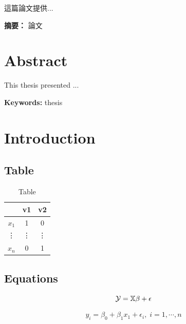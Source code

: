 \documentclass[12pt,a4paper,oneside]{book}
\providecommand{\keywordsch}[1]
{
  \small  
  \textbf{摘要： }#1
}
\providecommand{\keywords}[1]
{
  \small  
  \textbf{Keywords: }#1
}
\begin{document}
這篇論文提供...

\mbox{}
\vfill
\keywordsch{論文}%

\thispagestyle{empty}

\chapter*{\centering Abstract}

This thesis presented ...

\mbox{}
\vfill
\keywords{thesis}%

\thispagestyle{empty}

\newpage
\setcounter{page}{1}
{
  \hypersetup{linkcolor=black}
  \tableofcontents
}

\newpage

\chapter{Introduction}
\label{ch: intro}
\section{Table}

\begin{table}[H]
\centering
\fontsize{20}{20}\selectfont%
\caption{Table}
\renewcommand{\arraystretch}{1.5}
\label{tab: tab1}
\begin{tabular}[t]{|c|c|c|}%
    \hline
    & v1 & v2 \\
    \hline
    $x_1$ & 1 & 0\\
    \hline
    \vdots & \vdots & \vdots\\
    \hline
    $x_n$ & 0 & 1\\
    \hline
\end{tabular}
\end{table}

\section{Equations}
\begin{equation}\label{equ: reg}
    \Large{\mathcal{Y} = \mathbb{X}\beta+\epsilon}
\end{equation}

\begin{equation*}\label{equ: reg}
    y_i =\beta_0+\beta_1x_1+\epsilon_i,\;i=1,\cdots,n
\end{equation*}
\end{document}
